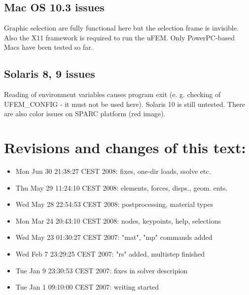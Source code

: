 \documentclass{article}
\begin{document}
\subsection{Mac OS 10.3 issues}

 Graphic selection are fully functional here but
 the selection frame is invisible. Also the X11 framework is
 required to run the uFEM. Only PowerPC-based Macs have been
 tested so far.



\subsection{Solaris 8, 9 issues}

 Reading of environment variables causes program exit
 (e. g. checking of UFEM\_CONFIG - it must not be used here).
 Solaris 10 is still untested. There are also color issues
 on SPARC platform (red image).



\section{Revisions and changes of this text:}
\begin{itemize}
\item  Mon Jun 30 21:38:27 CEST 2008: fixes, one-dir loads, ssolve etc.
\item  Thu May 29 11:24:10 CEST 2008: elements, forces, disps., geom. ents.
\item  Wed May 28 22:54:53 CEST 2008: postprocessing, material types
\item  Mon Mar 24 20:43:10 CEST 2008: nodes, keypoints, help, selections
\item  Wed May 23 01:30:27 CEST 2007: "mat", "mp" commands added
\item  Wed Feb  7 23:29:25 CEST 2007: "rs" added, multistep finished
\item  Tue Jan  9 23:30:53 CEST 2007: fixes in solver descripion
\item  Tue Jan  1 09:10:00 CEST 2007: writing started
\end{itemize}
\end{document}

